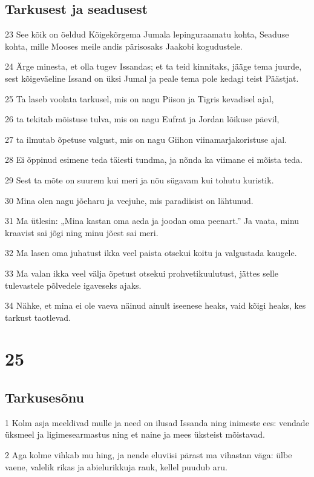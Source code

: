 \section*{Tarkusest ja seadusest}

\par 23 See kõik on öeldud Kõigekõrgema Jumala lepinguraamatu kohta, Seaduse kohta, mille Mooses meile andis pärisosaks Jaakobi kogudustele.
\par 24 Ärge minesta, et olla tugev Issandas; et ta teid kinnitaks, jääge tema juurde, sest kõigeväeline Issand on üksi Jumal ja peale tema pole kedagi teist Päästjat.
\par 25 Ta laseb voolata tarkusel, mis on nagu Piison ja Tigris kevadisel ajal,
\par 26 ta tekitab mõistuse tulva, mis on nagu Eufrat ja Jordan lõikuse päevil,
\par 27 ta ilmutab õpetuse valgust, mis on nagu Giihon viinamarjakoristuse ajal.
\par 28 Ei õppinud esimene teda täiesti tundma, ja nõnda ka viimane ei mõista teda.
\par 29 Sest ta mõte on suurem kui meri ja nõu sügavam kui tohutu kuristik.
\par 30 Mina olen nagu jõeharu ja veejuhe, mis paradiisist on lähtunud.
\par 31 Ma ütlesin: „Mina kastan oma aeda ja joodan oma peenart.” Ja vaata, minu kraavist sai jõgi ning minu jõest sai meri.
\par 32 Ma lasen oma juhatust ikka veel paista otsekui koitu ja valgustada kaugele.
\par 33 Ma valan ikka veel välja õpetust otsekui prohvetikuulutust, jättes selle tulevastele põlvedele igaveseks ajaks.
\par 34 Nähke, et mina ei ole vaeva näinud ainult iseenese heaks, vaid kõigi heaks, kes tarkust taotlevad.

\chapter{25}

\section*{Tarkusesõnu}

\par 1 Kolm asja meeldivad mulle ja need on ilusad Issanda ning inimeste ees: vendade üksmeel ja ligimesearmastus ning et naine ja mees üksteist mõistavad.
\par 2 Aga kolme vihkab mu hing, ja nende eluviisi pärast ma vihastan väga: ülbe vaene, valelik rikas ja abielurikkuja rauk, kellel puudub aru.

